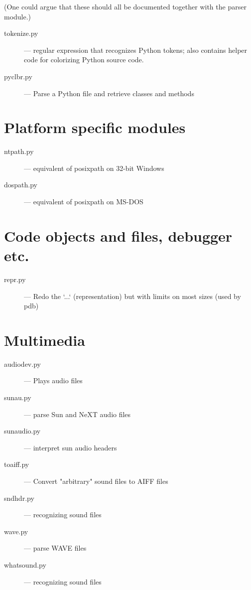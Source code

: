 (One could argue that these should all be documented together with the
parser module.)

\begin{description}
\item[tokenize.py]
--- regular expression that recognizes Python tokens; also
contains helper code for colorizing Python source code.

\item[pyclbr.py]
--- Parse a Python file and retrieve classes and methods
\end{description}


\section{Platform specific modules}

\begin{description}
\item[ntpath.py]
--- equivalent of posixpath on 32-bit Windows

\item[dospath.py]
--- equivalent of posixpath on MS-DOS
\end{description}


\section{Code objects and files, debugger etc.}

\begin{description}
\item[repr.py]
--- Redo the `...` (representation) but with limits on most
sizes (used by pdb)
\end{description}


\section{Multimedia}

\begin{description}
\item[audiodev.py]
--- Plays audio files

\item[sunau.py]
--- parse Sun and NeXT audio files

\item[sunaudio.py]
--- interpret sun audio headers

\item[toaiff.py]
--- Convert "arbitrary" sound files to AIFF files

\item[sndhdr.py]
--- recognizing sound files

\item[wave.py]
--- parse WAVE files

\item[whatsound.py]
--- recognizing sound files
\end{description}


